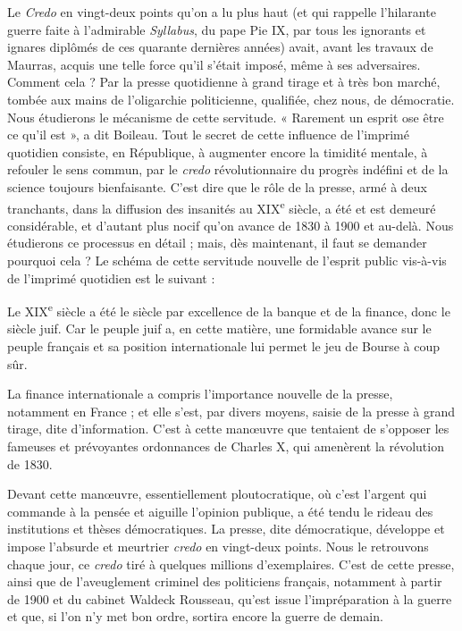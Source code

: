\documentclass[french,twoside]{book} %
\begin{document}
Le {\itshape Credo} en vingt-deux points qu’on a lu plus haut (et qui rappelle l’hilarante guerre faite à l’admirable {\itshape Syllabus}, du pape Pie IX, par tous les ignorants et ignares diplômés de ces quarante dernières années) avait, avant les travaux de Maurras, acquis une telle force qu’il s’était imposé, même à ses adversaires. Comment cela ? Par la presse quotidienne à grand tirage et à très bon marché, tombée aux mains de l’oligarchie politicienne, qualifiée, chez nous, de démocratie. Nous étudierons le mécanisme de cette servitude. « Rarement un esprit ose être ce qu’il est », a dit Boileau. Tout le secret de cette influence de l’imprimé quotidien consiste, en République, à augmenter encore la timidité mentale, à refouler le sens commun, par le {\itshape credo} révolutionnaire du progrès indéfini et de la science toujours bienfaisante. C’est dire que le rôle de la presse, armé à deux tranchants, dans la diffusion des insanités au XIX\textsuperscript{e} siècle, a été et est demeuré considérable, et d’autant plus nocif qu’on avance de 1830 à 1900 et au-delà. Nous étudierons ce processus en détail ; mais, dès maintenant, il faut se demander pourquoi cela ? Le schéma de cette servitude nouvelle de l’esprit public vis-à-vis de l’imprimé quotidien est le suivant :\par
Le XIX\textsuperscript{e} siècle a été le siècle par excellence de la banque et de la finance, donc le siècle juif. Car le peuple juif a, en cette matière, une formidable avance sur le peuple français et sa position internationale lui permet le jeu de Bourse à coup sûr.\par
La finance internationale a compris l’importance nouvelle de la presse, notamment en France ; et elle s’est, par divers moyens, saisie de la presse à grand tirage, dite d’information. C’est à cette manœuvre que tentaient de s’opposer les fameuses et prévoyantes ordonnances de Charles X, qui amenèrent la révolution de 1830.\par
Devant cette manœuvre, essentiellement ploutocratique, où c’est l’argent qui commande à la pensée et aiguille l’opinion publique, a été tendu le rideau des institutions et thèses démocratiques. La presse, dite démocratique, développe et impose l’absurde et meurtrier {\itshape credo} en vingt-deux points. Nous le retrouvons chaque jour, ce {\itshape credo} tiré à quelques millions d’exemplaires. C’est de cette presse, ainsi que de l’aveuglement criminel des politiciens français, notamment à partir de 1900 et du cabinet Waldeck Rousseau, qu’est issue l’impréparation à la guerre et que, si l’on n’y met bon ordre, sortira encore la guerre de demain.\par
\end{document}
